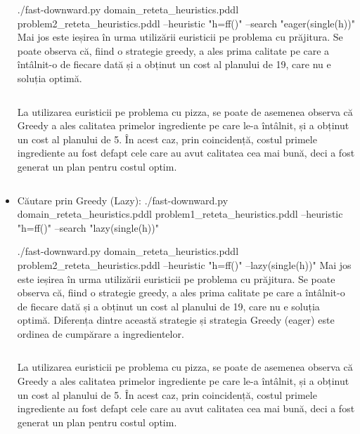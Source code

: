\begin{itemize}
  
  \newline
./fast-downward.py domain\_reteta\_heuristics.pddl problem2\_reteta\_heuristics.pddl --heuristic "h=ff()" --search "eager(single(h))"
    \newline
      \newline
    Mai jos este ieșirea în urma utilizării euristicii pe problema cu prăjitura. Se poate observa că, fiind o strategie greedy, a ales prima calitate pe care a întâlnit-o de fiecare dată și a obținut un cost al planului de 19, care nu e soluția optimă. 
      \newline
        \inputminted[linenos]{C}{cod/rez_problem_heuristic_eager_greedy.txt}
       \newline
      \newline
       La utilizarea euristicii pe problema cu pizza, se poate de asemenea observa că Greedy a ales calitatea primelor ingrediente pe care le-a întâlnit, și a obținut un cost al planului de 5. În acest caz, prin coincidență, costul primele ingrediente au fost defapt cele care au avut calitatea cea mai bună, deci a fost generat un plan pentru costul optim.
      \newline
        \inputminted[linenos]{C}{cod/rez_problem2_heuristic_eager_greedy.txt}    
    \item Căutare prin Greedy (Lazy):
    \newline
      \newline
    ./fast-downward.py domain\_reteta\_heuristics.pddl problem1\_reteta\_heuristics.pddl --heuristic "h=ff()" --search "lazy(single(h))"

    
  
  \newline
   ./fast-downward.py domain\_reteta\_heuristics.pddl problem2\_reteta\_heuristics.pddl --heuristic "h=ff()" --lazy(single(h))"
      \newline
      \newline
     Mai jos este ieșirea în urma utilizării euristicii pe problema cu prăjitura. Se poate observa că, fiind o strategie greedy, a ales prima calitate pe care a întâlnit-o de fiecare dată și a obținut un cost al planului de 19, care nu e soluția optimă. Diferența dintre această strategie și strategia Greedy (eager) este ordinea de cumpărare a ingredientelor. 
     \newline
        \inputminted[linenos]{C}{cod/rez_problem_heuristic_lazy_greedy.txt}
       \newline
      \newline
        La utilizarea euristicii pe problema cu pizza, se poate de asemenea observa că Greedy a ales calitatea primelor ingrediente pe care le-a întâlnit, și a obținut un cost al planului de 5. În acest caz, prin coincidență, costul primele ingrediente au fost defapt cele care au avut calitatea cea mai bună, deci a fost generat un plan pentru costul optim.
      \newline
        \inputminted[linenos]{C}{cod/rez_problem2_heuristic_lazy_greedy.txt}   

\end{itemize}

